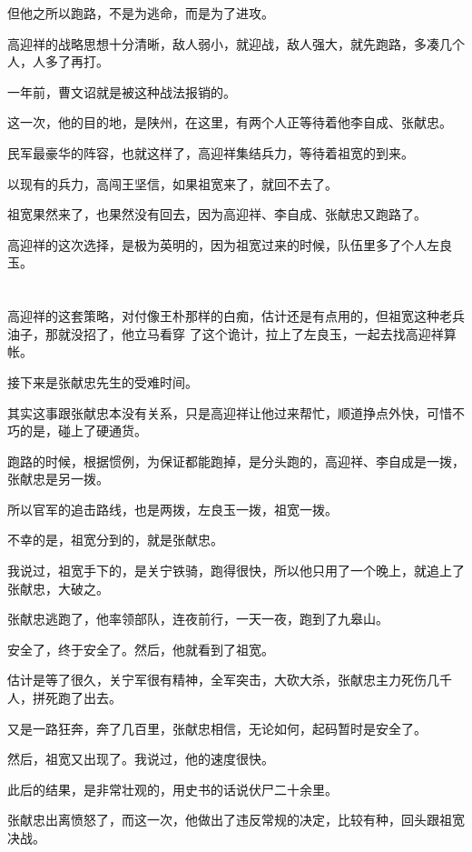 \documentclass[11pt,a4paper,onecolumn]{article}
\begin{document}
但他之所以跑路，不是为逃命，而是为了进攻。

高迎祥的战略思想十分清晰，敌人弱小，就迎战，敌人强大，就先跑路，多凑几个人，人多了再打。

一年前，曹文诏就是被这种战法报销的。

这一次，他的目的地，是陕州，在这里，有两个人正等待着他\myrule 李自成、张献忠。

民军最豪华的阵容，也就这样了，高迎祥集结兵力，等待着祖宽的到来。

以现有的兵力，高闯王坚信，如果祖宽来了，就回不去了。

祖宽果然来了，也果然没有回去，因为高迎祥、李自成、张献忠又跑路了。

高迎祥的这次选择，是极为英明的，因为祖宽过来的时候，队伍里多了个人\myrule 左良玉。

\section[\thesection]{}

高迎祥的这套策略，对付像王朴那样的白痴，估计还是有点用的，但祖宽这种老兵油子，那就没招了，他立马看穿
了这个诡计，拉上了左良玉，一起去找高迎祥算帐。

接下来是张献忠先生的受难时间。

其实这事跟张献忠本没有关系，只是高迎祥让他过来帮忙，顺道挣点外快，可惜不巧的是，碰上了硬通货。

跑路的时候，根据惯例，为保证都能跑掉，是分头跑的，高迎祥、李自成是一拨，张献忠是另一拨。

所以官军的追击路线，也是两拨，左良玉一拨，祖宽一拨。

不幸的是，祖宽分到的，就是张献忠。

我说过，祖宽手下的，是关宁铁骑，跑得很快，所以他只用了一个晚上，就追上了张献忠，大破之。

张献忠逃跑了，他率领部队，连夜前行，一天一夜，跑到了九皋山。

安全了，终于安全了。然后，他就看到了祖宽。

估计是等了很久，关宁军很有精神，全军突击，大砍大杀，张献忠主力死伤几千人，拼死跑了出去。

又是一路狂奔，奔了几百里，张献忠相信，无论如何，起码暂时是安全了。

然后，祖宽又出现了。我说过，他的速度很快。

此后的结果，是非常壮观的，用史书的话说\myrule 伏尸二十余里。

张献忠出离愤怒了，而这一次，他做出了违反常规的决定，比较有种，回头跟祖宽决战。
\end{document}
